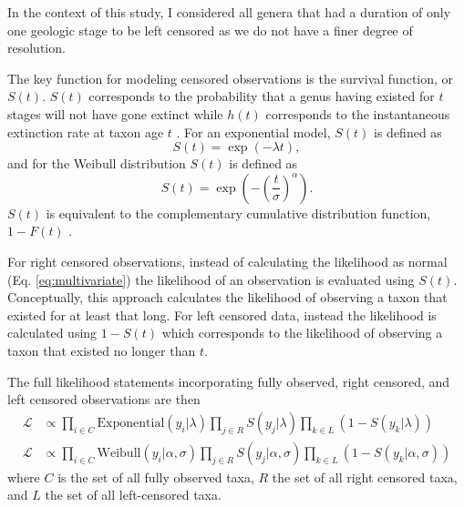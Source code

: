 \documentclass[12pt,letterpaper]{article}
\begin{document}
In the context of this study, I considered all genera that had a duration of only one geologic stage to be left censored as we do not have a finer degree of resolution. 

The key function for modeling censored observations is the survival function, or \(S(t)\). \(S(t)\) corresponds to the probability that a genus having existed for \(t\) stages will not have gone extinct while \(h(t)\) corresponds to the instantaneous extinction rate at taxon age \(t\) \cite{Klein2003}. For an exponential model, \(S(t)\) is defined as
\begin{equation}
  S(t) = \exp(-\lambda t),
  \label{eq:exp_surv}
\end{equation}
and for the Weibull distribution \(S(t)\) is defined as
\begin{equation}
  S(t) = \exp\left(-\left(\frac{t}{\sigma}\right)^{\alpha}\right).
  \label{eq:wei_surv}
\end{equation}
\(S(t)\) is equivalent to the complementary cumulative distribution function, \(1 - F(t)\) \citep{Klein2003}. 

For right censored observations, instead of calculating the likelihood as normal (Eq. \ref{eq:multivariate}) the likelihood of an observation is evaluated using \(S(t)\). Conceptually, this approach calculates the likelihood of observing a taxon that existed for at least that long. For left censored data, instead the likelihood is calculated using \(1 - S(t)\) which corresponds to the likelihood of observing a taxon that existed no longer than \(t\).

The full likelihood statements incorporating fully observed, right censored, and left censored observations are then
\begin{equation}
  \begin{aligned}
    \mathcal{L} &\propto \prod_{i \in C} \mathrm{Exponential}(y_{i} | \lambda) \prod_{j \in R} S(y_{j} | \lambda) \prod_{k \in L} \left(1 - S(y_{k} | \lambda)\right) \\
    \mathcal{L} &\propto \prod_{i \in C} \mathrm{Weibull}(y_{i} | \alpha, \sigma) \prod_{j \in R} S(y_{j} | \alpha, \sigma) \prod_{k \in L} \left(1 - S(y_{k} | \alpha, \sigma)\right)
  \end{aligned}
  \label{eq:censored_likelihood}
\end{equation}
where \(C\) is the set of all fully observed taxa, \(R\) the set of all right censored taxa, and \(L\) the set of all left-censored taxa.
\end{document}
